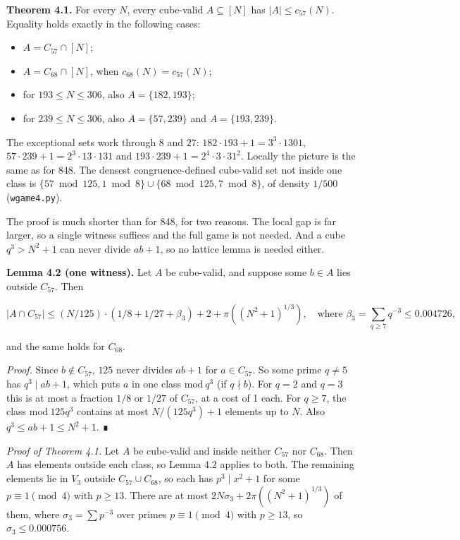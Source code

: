 \documentclass[
  11pt,
]{article}
\providecommand{\tightlist}{%
  \setlength{\itemsep}{0pt}\setlength{\parskip}{0pt}}
\begin{document}
\textbf{Theorem 4.1.} For every \(N\), every cube-valid
\(A \subseteq [N]\) has \(|A| \le c_{57}(N)\). Equality holds exactly in
the following cases:

\begin{itemize}
\tightlist
\item
  \(A = C_{57} \cap [N]\);
\item
  \(A = C_{68} \cap [N]\), when \(c_{68}(N) = c_{57}(N)\);
\item
  for \(193 \le N \le 306\), also \(A = \{182, 193\}\);
\item
  for \(239 \le N \le 306\), also \(A = \{57, 239\}\) and
  \(A = \{193, 239\}\).
\end{itemize}

The exceptional sets work through \(8\) and \(27\):
\(182\cdot 193 + 1 = 3^{3}\cdot 1301\),
\(57\cdot 239 + 1 = 2^{3}\cdot 13\cdot 131\) and
\(193\cdot 239 + 1 = 2^{4}\cdot 3\cdot 31^{2}\). Locally the picture is
the same as for 848. The densest congruence-defined cube-valid set not
inside one class is
\(\{57 \bmod 125, 1 \bmod 8\} \cup \{68 \bmod 125, 7 \bmod 8\}\), of
density \(1/500\) (\texttt{wgame4.py}).

The proof is much shorter than for 848, for two reasons. The local gap
is far larger, so a single witness suffices and the full game is not
needed. And a cube \(q^3 > N^2 + 1\) can never divide \(ab + 1\), so no
lattice lemma is needed either.

\textbf{Lemma 4.2 (one witness).} Let \(A\) be cube-valid, and suppose
some \(b \in A\) lies outside \(C_{57}\). Then

\[|A \cap C_{57}| \le (N/125)\cdot(1/8 + 1/27 + \beta_3) + 2 + \pi((N^2 + 1)^{1/3}), \quad \text{where } \beta_3 = \sum_{q\ge 7} q^{-3} \le 0.004726,\]

and the same holds for \(C_{68}\).

\emph{Proof.} Since \(b \notin C_{57}\), \(125\) never divides
\(ab + 1\) for \(a \in C_{57}\). So some prime \(q \ne 5\) has
\(q^3 \mid ab + 1\), which puts \(a\) in one class \(\mathrm{mod}\ q^3\)
(if \(q \nmid b\)). For \(q = 2\) and \(q = 3\) this is at most a
fraction \(1/8\) or \(1/27\) of \(C_{57}\), at a cost of 1 each. For
\(q \ge 7\), the class \(\mathrm{mod}\ 125q^3\) contains at most
\(N/(125q^3) + 1\) elements up to \(N\). Also
\(q^3 \le ab + 1 \le N^2 + 1\). ∎

\emph{Proof of Theorem 4.1.} Let \(A\) be cube-valid and inside neither
\(C_{57}\) nor \(C_{68}\). Then \(A\) has elements outside each class,
so Lemma 4.2 applies to both. The remaining elements lie in \(V_3\)
outside \(C_{57} \cup C_{68}\), so each has \(p^3 \mid x^2 + 1\) for
some \(p \equiv 1 \pmod{4}\) with \(p \ge 13\). There are at most
\(2N\sigma_3 + 2\pi((N^2 + 1)^{1/3})\) of them, where
\(\sigma_3 = \sum p^{-3}\) over primes \(p \equiv 1 \pmod{4}\) with
\(p \ge 13\), so \(\sigma_3 \le 0.000756\).
\end{document}
